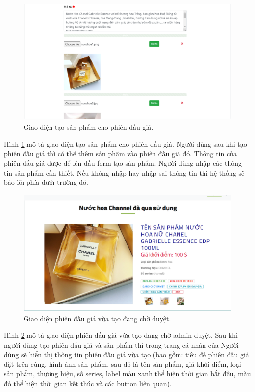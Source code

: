 \documentclass{article}
\begin{document}
\begin{figure}[H]
    \centering
    \includegraphics[width=11.4cm,height=6.32cm]{images/createitem2demo.png}
    \caption{Giao diện tạo sản phẩm cho phiên đấu giá.}
    \label{hinh415}
\end{figure}
Hình \ref{hinh415} mô tả giao diện tạo sản phẩm cho phiên đấu giá. Người dùng sau khi tạo phiên đấu giá thì có thể thêm sản phẩm vào phiên đấu giá đó. Thông tin của phiên đấu giá được để lên đầu form tạo sản phẩm. Người dùng nhập các thông tin sản phẩm cần thiết. Nếu không nhập hay nhập sai thông tin thì hệ thống sẽ báo lỗi phía dưới trường đó.
\begin{figure}[H]
    \centering
    \includegraphics[width=11.4cm,height=6.32cm]{images/auctionwait.png}
    \caption{Giao diện phiên đấu giá vừa tạo đang chờ duyệt.}
    \label{hinh416}
\end{figure}
Hình \ref{hinh416} mô tả giao diện phiên đấu giá vừa tạo đang chờ admin duyệt. Sau khi người dùng tạo phiên đấu giá và sản phẩm thì trong trang cá nhân của Người dùng sẽ hiển thị thông tin phiên đấu giá vừa tạo (bao gồm: tiêu đề phiên đấu giá đặt trên cùng, hình ảnh sản phẩm, sau đó là tên sản phẩm, giá khởi điểm, loại sản phẩm, thương hiệu, số series, label màu xanh thể hiện thời gian bắt đầu, màu đỏ thể hiện thời gian kết thúc và các button liên quan).\\
\end{document}
